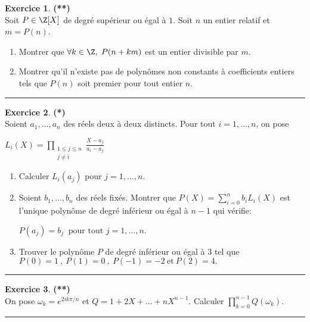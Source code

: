 \documentclass[a4paper,11pt]{article}
\theoremstyle{definition}
\newtheorem{exo}{Exercice} %
\begin{document}
\begin{minipage}{1\linewidth}
\begin{minipage}[t]{0.48\linewidth}
		\begin{exo}\textbf{(**)}\quad\\[0.2cm]
		Soit $P\in\Z[X]$ de degré supérieur ou égal à $1$. Soit $n$ un entier relatif 
		et $m=P(n)$.
		\begin{enumerate}
			\item  Montrer que $\forall k\in\Z,\;P(n+km)$ est un entier divisible par $m$.
			\item  Montrer qu'il n'existe pas de polynômes non constants à coefficients entiers tels que $P(n)$ soit premier pour tout entier $n$.
		\end{enumerate}
		\centering
		\rule{1\linewidth}{0.6pt}
	\end{exo}
	


		
	\end{minipage}	
	\hfill\vrule\hfill
	\begin{minipage}[t]{0.48\linewidth}
		\raggedright
		
		\begin{exo}\textbf{(*)}\quad\\[0.2cm]
			
			Soient $a_1,\ldots,a_n$ des réels deux à deux distincts.
			Pour tout $i=1,\ldots,n$, on pose
			
			\hfil $L_i(X)=\prod_{\substack{1\le j\le n \\ j\not= i}}\frac{X-a_j}{a_i-a_j}$
			\begin{enumerate}
				\item Calculer $L_i(a_j)$ pour $j=1,\ldots,n$.
				\item Soient $b_1,\ldots,b_n$ des réels fixés. 
				Montrer que $P(X)=\sum_{i=0}^nb_iL_i(X)$ est l'unique polynôme de degré inférieur ou égal à $n-1$ qui vérifie:
				
				$P(a_j)=b_j  \ \text{ pour tout }j=1,\ldots,n.$
				\item Trouver le polynôme $P$ de degré inférieur ou égal à $3$ tel que 
				$P(0)=1\ , \ P(1)=0\ , \ P(-1)=-2\ \text{et}\  P(2)=4.$
			\end{enumerate}
			\centering
			\rule{1\linewidth}{0.6pt}
		\end{exo}
	

			\begin{exo}\textbf{(**)}\quad\\[0.2cm]
			On pose $\omega_k=e^{2ik\pi/n}$ et $Q=1+2X+...+nX^{n-1}$. Calculer $\prod_{k=0}^{n-1}Q(\omega_k)$.
			
			\centering
			\rule{1\linewidth}{0.6pt}
		\end{exo}
		

\end{minipage}
\end{minipage}
\end{document}
